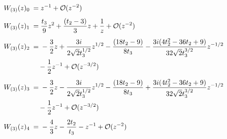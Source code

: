 \begin{sheetasymptotics}
    \begin{align*}
        \sheetlabel{W_{(3)}(z)_0} & ={} z^{-1} + \mathcal{O}(z^{-2}) \\[4pt]
        \sheetlabel{W_{(3)}(z)_1} & ={} \frac{t_3}{9} z^2 + \frac{(t_2-3)}{3} z + \frac{1}{z} + \mathcal{O}(z^{-2}) \\[4pt]
        \sheetlabel{W_{(3)}(z)_2} & ={} -\frac{3}{2} z + \frac{3i}{2\sqrt{2}t_3^{1/2}}z^{1/2} - \frac{(18t_2 -9)}{8t_3} - \frac{3i(4t_2^2 - 36t_2 + 9)}{32\sqrt{2} t_3^{3/2}} z^{-1/2} \\*
                                  & \quad{}- \frac{1}{2} z^{-1} + \mathcal{O}(z^{-3/2}) \\[4pt]
        \sheetlabel{W_{(3)}(z)_3} & ={} -\frac{3}{2} z - \frac{3i}{2\sqrt{2}t_3^{1/2}}z^{1/2} - \frac{(18t_2 -9)}{8t_3} + \frac{3i(4t_2^2 - 36t_2 + 9)}{32\sqrt{2} t_3^{3/2}} z^{-1/2} \\*
                                  & \quad{}- \frac{1}{2} z^{-1} + \mathcal{O}(z^{-3/2}) \\[4pt]
        \sheetlabel{W_{(3)}(z)_4} & ={} - \frac{4}{3} z - \frac{2t_2}{t_3} - z^{-1} + \mathcal{O}(z^{-2})
    \end{align*}
\end{sheetasymptotics}%
